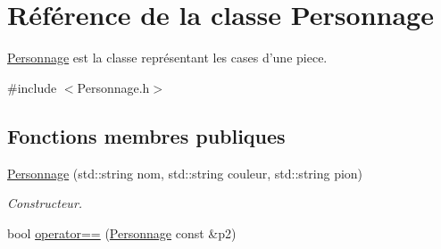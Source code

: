 \hypertarget{classPersonnage}{\section{\-Référence de la classe \-Personnage}
\label{classPersonnage}
}


\hyperlink{classPersonnage}{\-Personnage} est la classe représentant les cases d'une piece.  




{\ttfamily \#include $<$\-Personnage.\-h$>$}

\subsection*{\-Fonctions membres publiques}
\begin{DoxyCompactItemize}
\item 
\hyperlink{classPersonnage_a32ab14d53d8d1c5715af691b494fc9b1}{\-Personnage} (std\-::string nom, std\-::string couleur, std\-::string pion)
\begin{DoxyCompactList}\small\item\em \-Constructeur. \end{DoxyCompactList}\item 
\hypertarget{classPersonnage_a40dce2ec7abb60ec4b069c614e85c813}{bool \hyperlink{classPersonnage_a40dce2ec7abb60ec4b069c614e85c813}{operator==} (\hyperlink{classPersonnage}{\-Personnage} const \&p2)}\label{classPersonnage_a40dce2ec7abb60ec4b069c614e85c813}


\end{DoxyCompactItemize}
